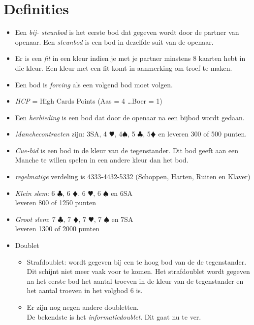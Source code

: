 \documentclass[12pt,a4paper]{report}
\begin{document}
\chapter{Definities}
\begin{itemize}
	\item 
	Een \emph{bij- steunbod} is het eerste bod dat gegeven wordt door de partner van openaar. 
	Een \emph{steunbod} is een bod in dezelfde suit van de openaar.
	
	\item 
	Er is een \emph{fit} in een kleur indien je met je partner minstens 8 
	kaarten hebt in die  kleur. 
	Een kleur met een fit komt in aanmerking om troef te maken.
	
	\item 
	Een bod is \emph{forcing}  als een volgend bod moet volgen.
	
	\item \emph{HCP} = High Cards Points 
	(Aas = 4 \dots Boer = 1)
	
	\item Een \emph{herbieding} is een bod dat door de openaar na een bijbod wordt gedaan.
	
	\item \emph{Manchecontracten} zijn: 
	3SA, 4 $\varheartsuit$, 4$\spadesuit$, 5 $\clubsuit$, 5$\vardiamondsuit$ 
	en leveren 300 of 500 punten.	
	
	\item \emph{Cue-bid} is een bod in de kleur van de tegenstander. 
	Dit bod geeft aan een Manche te willen spelen in een andere kleur dan het bod.
	
	\item \emph{regelmatige} verdeling is 4333-4432-5332 (Schoppen, Harten, Ruiten en Klaver)
	
	\item \emph{Klein slem}: 6 $\clubsuit$, 6 $\vardiamondsuit$, 6 $\varheartsuit$, 6 $\spadesuit$ en 6SA\\
	leveren 800 of 1250 punten
		
	\item \emph{Groot slem}: 7 $\clubsuit$, 7 $\vardiamondsuit$, 7 $\varheartsuit$, 7 $\spadesuit$ en 7SA\\
    leveren 1300 of 2000 punten 
    
    \item Doublet
    \begin{itemize}
    	\item Strafdoublet: wordt gegeven bij een te hoog bod van de de tegenstander. \\
    	Dit schijnt niet meer vaak voor te komen. 
    	Het strafdoublet wordt gegeven na het eerste bod het aantal troeven in de kleur 
    	van de tegenstander en het aantal troeven in het volgbod 6 is.
    	\item Er zijn nog negen andere doubletten. \\
    	De bekendste is het \emph{informatiedoublet}. Dit gaat nu te ver.
    \end{itemize}  		
	

\end{itemize}
\end{document}
